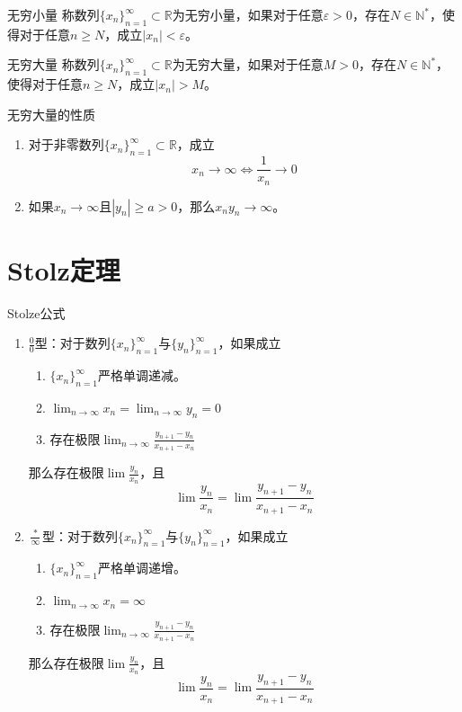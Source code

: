 \documentclass[lang = cn, scheme = chinese, thmcnt = section]{elegantbook}
\newcommand{\N}{\mathbb{N}}            %
\newcommand{\R}{\mathbb{R}}            %
\newcommand{\sub}{\subset}             %
\newcommand{\dis}{\displaystyle}
\begin{document}
\begin{definition}{无穷小量}
	称数列$\{x_n\}_{n=1}^{\infty}\sub \R$为无穷小量，如果对于任意$\varepsilon>0$，存在$N\in\N^*$，使得对于任意$n\ge N$，成立$|x_n|<\varepsilon$。
\end{definition}

\begin{definition}{无穷大量}
	称数列$\{x_n\}_{n=1}^{\infty}\sub \R$为无穷大量，如果对于任意$M>0$，存在$N\in\N^*$，使得对于任意$n\ge N$，成立$|x_n|>M$。
\end{definition}

\begin{proposition}{无穷大量的性质}
	\begin{enumerate}
		\item 对于非零数列$\{x_n\}_{n=1}^{\infty}\sub \R$，成立
		$$
		x_n\to\infty\iff \frac{1}{x_n}\to 0
		$$
		\item 如果$x_n\to\infty$且$|y_n|\ge a>0$，那么$x_ny_n\to\infty$。
	\end{enumerate}
\end{proposition}

\section{Stolz定理}

\begin{theorem}{Stolze公式}
	\begin{enumerate}
		\item $\displaystyle\frac{0}{0}$型：对于数列$\{x_n\}_{n=1}^{\infty}$与$\{y_n\}_{n=1}^{\infty}$，如果成立
		\begin{enumerate}
			\item $\{x_n\}_{n=1}^{\infty}$严格单调递减。
			\item $\dis \lim_{n\to\infty}x_n=\lim_{n\to\infty}y_n=0$
			\item 存在极限$\dis\lim_{n\to\infty}\frac{y_{n+1}-y_n}{x_{n+1}-x_n}$
		\end{enumerate}
		那么存在极限$\dis\lim\frac{y_n}{x_n}$，且
		$$
		\lim\frac{y_n}{x_n}=\lim\frac{y_{n+1}-y_n}{x_{n+1}-x_n}
		$$
		\item $\displaystyle\frac{*}{\infty}$型：对于数列$\{x_n\}_{n=1}^{\infty}$与$\{y_n\}_{n=1}^{\infty}$，如果成立
		\begin{enumerate}
			\item $\{x_n\}_{n=1}^{\infty}$严格单调递增。
			\item $\dis \lim_{n\to\infty}x_n=\infty$
			\item 存在极限$\dis \lim_{n\to\infty}\frac{y_{n+1}-y_n}{x_{n+1}-x_n}$
		\end{enumerate}
		那么存在极限$\dis\lim\frac{y_n}{x_n}$，且
		$$
		\lim\frac{y_n}{x_n}=\lim\frac{y_{n+1}-y_n}{x_{n+1}-x_n}
		$$
	\end{enumerate}
\end{theorem}
\end{document}
